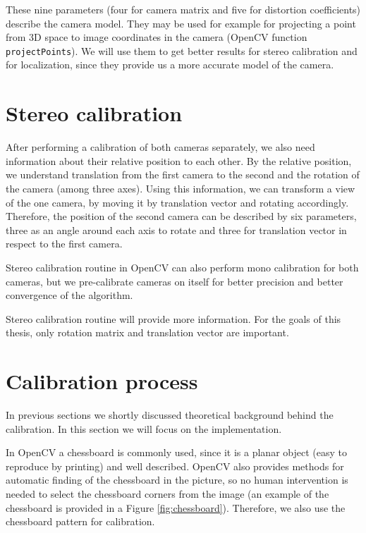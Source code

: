 These nine parameters (four for camera matrix and five for distortion
coefficients) describe the camera model. They may be used for example for
projecting a point from 3D space to image coordinates in the camera (OpenCV
function \verb+projectPoints+). We will use them to get better results for
stereo calibration and for localization, since they provide us a more accurate
model of the camera.



\section{Stereo calibration}

After performing a calibration of both cameras separately, we also need
information about their relative position to each other. By the relative
position, we understand translation from the first camera to the second and the
rotation of the camera (among three axes). Using this information, we can
transform a view of the one camera, by moving it by translation vector and
rotating accordingly. Therefore, the position of the second camera can be
described by six parameters, three as an angle around each axis to rotate and
three for translation vector in respect to the first camera.

Stereo calibration routine in OpenCV can also perform mono calibration for both
cameras, but we pre-calibrate cameras on itself for better precision and better
convergence of the algorithm.

Stereo calibration routine will provide more information. For the goals of this
thesis, only rotation matrix and translation vector are important.

\section{Calibration process}

In previous sections we shortly discussed theoretical background behind the
calibration. In this section we will focus on the implementation.

In OpenCV a chessboard is commonly used, since it is a planar object (easy to
reproduce by printing) and well described. OpenCV also provides methods for
automatic finding of the chessboard in the picture, so no human intervention is
needed to select the chessboard corners from the image (an example of the
chessboard is provided in a Figure \ref{fig:chessboard}). Therefore, we also
use the chessboard pattern for calibration.

